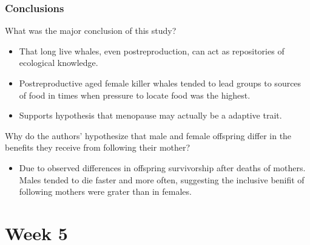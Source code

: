 \documentclass[12pt,a4paper]{article}
\begin{document}
\subsubsection{Conclusions}
\begin{itemize}
    {\color{G-Moon}\item What was the major conclusion of this study?}
        \begin{itemize}
            \item That long live whales, even postreproduction, can act as repositories of ecological knowledge.
            \item Postreproductive aged female killer whales tended to lead groups to sources of food in times when pressure to locate food was the highest. 
            \item Supports hypothesis that menopause may actually be a adaptive trait.
        \end{itemize}
    {\color{G-Moon}\item Why do the authors’ hypothesize that male and female offspring differ in the benefits they receive from following their mother?}
        \begin{itemize}
            \item Due to observed differences in offspring survivorship after deaths of mothers. Males tended to die faster and more often, suggesting the inclusive benifit of following mothers were grater than in females.
        \end{itemize}
\end{itemize}

\clearpage
\section*{Week 5}
{}

\end{document}
